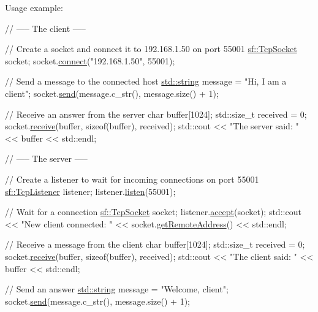 Usage example\-: 
\begin{DoxyCode}
\textcolor{comment}{// ----- The client -----}

\textcolor{comment}{// Create a socket and connect it to 192.168.1.50 on port 55001}
\hyperlink{classsf_1_1_tcp_socket}{sf::TcpSocket} socket;
socket.\hyperlink{classsf_1_1_tcp_socket_a68cd42d5ab70ab54b16787f555951c40}{connect}(\textcolor{stringliteral}{"192.168.1.50"}, 55001);

\textcolor{comment}{// Send a message to the connected host}
\hyperlink{gl3_8h_ac83513893df92266f79a515488701770}{std::string} message = \textcolor{stringliteral}{"Hi, I am a client"};
socket.\hyperlink{classsf_1_1_tcp_socket_affce26ab3bcc4f5b9269dad79db544c0}{send}(message.c\_str(), message.size() + 1);

\textcolor{comment}{// Receive an answer from the server}
\textcolor{keywordtype}{char} buffer[1024];
std::size\_t received = 0;
socket.\hyperlink{classsf_1_1_tcp_socket_a90ce50811ea61d4f00efc62bb99ae1af}{receive}(buffer, \textcolor{keyword}{sizeof}(buffer), received);
std::cout << \textcolor{stringliteral}{"The server said: "} << buffer << std::endl;

\textcolor{comment}{// ----- The server -----}

\textcolor{comment}{// Create a listener to wait for incoming connections on port 55001}
\hyperlink{classsf_1_1_tcp_listener}{sf::TcpListener} listener;
listener.\hyperlink{classsf_1_1_tcp_listener_a409d9350d3abfea9636df8cf4a61004e}{listen}(55001);

\textcolor{comment}{// Wait for a connection}
\hyperlink{classsf_1_1_tcp_socket}{sf::TcpSocket} socket;
listener.\hyperlink{classsf_1_1_tcp_listener_ae2c83ce5a64d50b68180c46bef0a7346}{accept}(socket);
std::cout << \textcolor{stringliteral}{"New client connected: "} << socket.\hyperlink{classsf_1_1_tcp_socket_a7904ca6ab9e018021e305a3aeb7a1b9a}{getRemoteAddress}() << std::endl;

\textcolor{comment}{// Receive a message from the client}
\textcolor{keywordtype}{char} buffer[1024];
std::size\_t received = 0;
socket.\hyperlink{classsf_1_1_tcp_socket_a90ce50811ea61d4f00efc62bb99ae1af}{receive}(buffer, \textcolor{keyword}{sizeof}(buffer), received);
std::cout << \textcolor{stringliteral}{"The client said: "} << buffer << std::endl;

\textcolor{comment}{// Send an answer}
\hyperlink{gl3_8h_ac83513893df92266f79a515488701770}{std::string} message = \textcolor{stringliteral}{"Welcome, client"};
socket.\hyperlink{classsf_1_1_tcp_socket_affce26ab3bcc4f5b9269dad79db544c0}{send}(message.c\_str(), message.size() + 1);
\end{DoxyCode}


